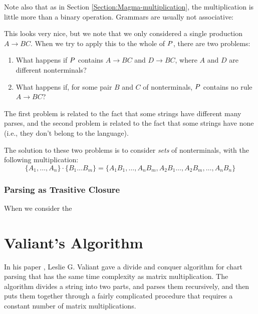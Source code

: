 \documentclass{article}
\begin{document}
Note also that as in Section \ref{Section:Magma-multiplication}, the multiplication is little more than a binary operation. Grammars are usually not associative: 

This looks very nice, but we note that we only considered a single production $A \to BC$. When we try to apply this to the whole of $P$, there are two problems:
\begin{enumerate}
\item What happens if $P$ contains $A \to BC$ and $D \to BC$, where $A$ and $D$ are different nonterminals?
\item What happens if, for some pair $B$ and $C$ of nonterminals, $P$ contains no rule $A \to BC$?
\end{enumerate}
The first problem is related to the fact that some strings have different many parses, and the second problem is related to the fact that some strings have none (i.e., they don't belong to the language).

The solution to these two problems is to consider \emph{sets} of nonterminals, with the following multiplication:
\begin{equation*}
  \{A_1, \ldots, A_n \} \cdot \{B_1 \ldots B_m\} = \{A_1B_1, \ldots, A_nB_m, A_2B_1 \ldots, A_2B_m, \ldots, A_nB_n\}
\end{equation*}
\subsubsection{Parsing as Trasitive Closure}

When we consider the 


\label{Section:Magma-multiplication}
\newcommand{\zeromat}{\mathbf{0}}
\section{Valiant's Algorithm}
In his paper \cite{Valiant's-Algorithm}, Leslie G. Valiant gave a divide and conquer algorithm for chart parsing that has the same time complexity as matrix multiplication. The algorithm divides a string into two parts, and parses them recursively, and then puts them together through a fairly complicated procedure that requires a constant number of matrix multiplications.
\end{document}
